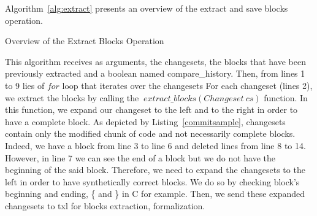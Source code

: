 \documentclass[conference]{IEEEtran}
\begin{document}
Algorithm~\ref{alg:extract} presents an overview of the extract and save blocks operation.

\begin{algorithm}[H]


 \caption{Overview of the Extract Blocks Operation\label{alg:extract}}
\end{algorithm}

This algorithm receives as arguments, the changesets, the blocks that have been previously extracted and a boolean named compare\_history.
Then, from lines 1 to 9 lies of $for$ loop that iterates over the changesets
For each changeset (lines 2), we extract the blocks by calling the $~extract\_blocks(Changeset~cs)$ function.
In this function, we expand our changeset to the left and to the right in order to have a complete block.
As depicted by Listing~\ref{commitsample}, changesets contain only the modified chunk of code and not necessarily complete blocks.
Indeed, we have a block from line 3 to line 6 and deleted lines from line 8 to 14.
However, in line 7 we can see the end of a block but we do not have the beginning of the said block.
Therefore, we need to expand the changesets to the left in order to have synthetically correct blocks.
We do so by checking block's beginning and ending, \{ and \} in C for example.
Then, we send these expanded changesets to txl for blocks extraction, formalization.

\noindent\begin{minipage}{0.90\linewidth}

  

\end{minipage}
\end{document}
